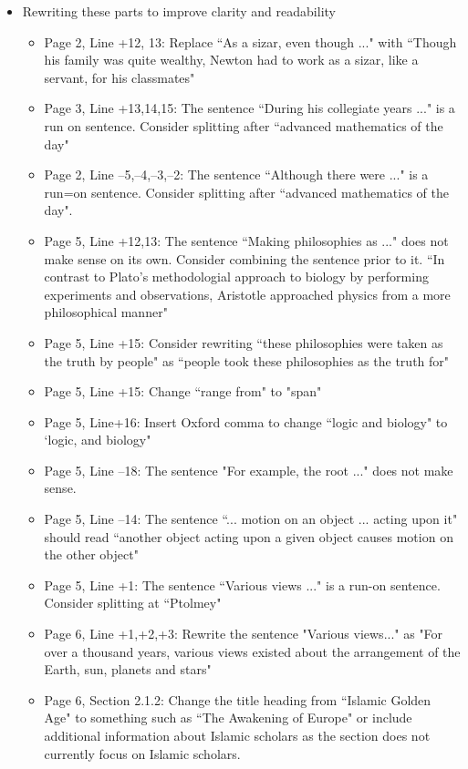 \documentclass[11pt]{article}
\begin{document}
\begin{itemize}
\item Rewriting these parts to improve clarity and readability
	\begin{itemize}
		\item Page 2, Line +12, 13: Replace ``As a sizar, even though ..." with ``Though his family was quite wealthy, Newton had to work as a sizar, like a servant, for his classmates"
		\item Page 3, Line +13,14,15: The sentence ``During his collegiate years ..." is a run on sentence. Consider splitting after ``advanced mathematics of the day"
		\item Page 2, Line --5,--4,--3,--2: The sentence ``Although there were ..." is a run=on sentence. Consider splitting after ``advanced mathematics of the day".
		\item Page 5, Line +12,13: The sentence ``Making philosophies as ..."  does not make sense on its own. Consider combining the sentence prior to it. ``In contrast to Plato's methodologial approach to biology by performing experiments and observations, Aristotle approached physics from a more philosophical manner"
		\item Page 5, Line +15: Consider rewriting ``these philosophies were taken as the truth by people" as ``people took these philosophies as the truth for"
		\item Page 5, Line +15: Change ``range from" to "span"
		\item Page 5, Line+16: Insert Oxford comma to change ``logic and biology" to `logic, and biology"
		\item Page 5, Line --18: The sentence "For example, the root ..." does not make sense.
		\item Page 5, Line --14: The sentence ``... motion on an object ... acting upon it" should read ``another object acting upon a given object causes motion on the other object"
		\item Page 5, Line +1: The sentence ``Various views ..." is a run-on sentence. Consider splitting at ``Ptolmey"
		\item Page 6, Line +1,+2,+3: Rewrite the sentence "Various views..." as "For over a thousand years, various views existed about the arrangement of the Earth, sun, planets and stars"
		\item Page 6, Section 2.1.2: Change the title heading from ``Islamic Golden Age" to something such as ``The Awakening of Europe" or include additional information about Islamic scholars as the section does not currently focus on Islamic scholars.

\end{itemize}
\end{itemize}
\end{document}
